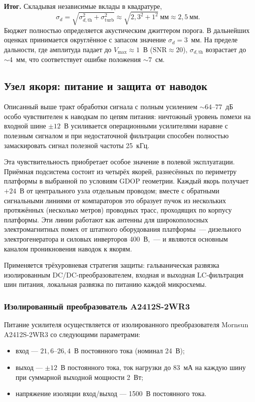 \textbf{Итог.} Складывая независимые вклады в квадратуре,
$$
\sigma_d=\sqrt{\sigma_{d,\mathrm{th}}^2+\sigma_{\mathrm{turb}}^2}
\approx\sqrt{2{,}3^2+1^2}~\text{мм}\approx2{,}5~\text{мм}.
$$
Бюджет полностью определяется акустическим джиттером порога. В дальнейших оценках
принимается округлённое с запасом значение $\sigma_d=3$~мм. На пределе дальности, где
амплитуда падает до $V_{\max}\approx1$~В ($\mathrm{SNR}\approx20$), $\sigma_{d,\mathrm{th}}$
возрастает до ${\sim}4$~мм, что соответствует ошибке положения ${\sim}7$~см.

\FloatBarrier

\subsection{Узел якоря: питание и защита от наводок}
\label{sec:anchor-power}

Описанный выше тракт обработки сигнала с полным усилением ${\sim}64\text{--}77$~дБ
особо чувствителен к наводкам по цепям питания: ничтожный уровень помехи на входной
шине $\pm 12$~В усиливается операционными усилителями наравне с полезным сигналом
и при недостаточной фильтрации способен полностью замаскировать сигнал
полезной частоты 25~кГц.

Эта чувствительность приобретает особое значение в полевой эксплуатации.
Приёмная подсистема состоит из четырёх якорей, разнесённых по периметру платформы
в выбранной по условиям GDOP геометрии. Каждый якорь получает $+24$~В от центрального
узла отдельным проводом; вместе с обратными сигнальными линиями от компараторов
это образует пучок из нескольких протяжённых (несколько метров) проводных трасс,
проходящих по корпусу платформы.
Эти линии работают как антенны для широкополосных электромагнитных помех
от штатного оборудования платформы~--- дизельного электрогенератора и силовых
инверторов 400~В,~--- и являются основным каналом проникновения наводок к якорям.

Применяется трёхуровневая стратегия защиты: гальваническая развязка изолированным
DC/DC-преобразователем, входная и выходная LC-фильтрация шин питания, локальная развязка
по питанию каждой микросхемы.

\subsubsection{Изолированный преобразователь A2412S-2WR3}

Питание усилителя осуществляется от изолированного преобразователя Mornsun A2412S-2WR3
со следующими параметрами:
\begin{itemize}
    \item вход --- $21{,}6\text{--}26{,}4$~В постоянного тока (номинал 24~В);
    \item выход --- $\pm 12$~В постоянного тока, ток нагрузки до 83~мА на каждую шину
          при суммарной выходной мощности 2~Вт;
    \item напряжение изоляции вход/выход --- 1500~В постоянного тока.
\end{itemize}

